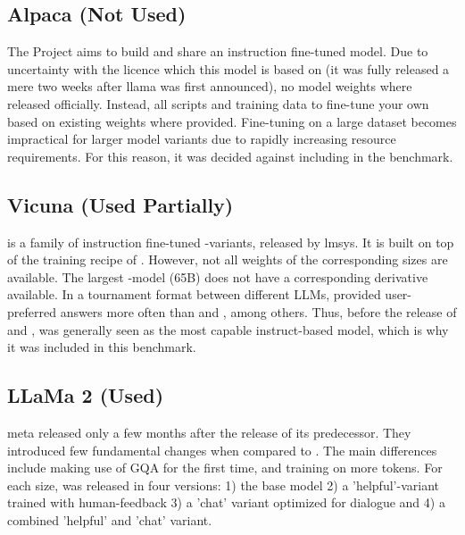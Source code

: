 \subsection{Alpaca (Not Used)}\label{sub:alpaca}
The  Project \cite{tatsulab_2023} aims to build and share an instruction fine-tuned  model.
Due to uncertainty with the  licence which this model is based on (it was fully released a mere two weeks after \gls{llama} was first announced), no model weights where released officially.
Instead, all scripts and training data to fine-tune your own  based on existing  weights where provided.
Fine-tuning on a large dataset becomes impractical for larger model variants due to rapidly increasing resource requirements.
For this reason, it was decided against including  in the benchmark.


\subsection{Vicuna (Used Partially)}\label{sub:vicuna}
 is a family of instruction fine-tuned -variants, released by \gls{lmsys}. It is built on top of the training recipe of .
However, not all weights of the corresponding  sizes are available.
The largest -model (65B) does not have a corresponding  derivative available.
In a tournament format between different \glspl{LLM},  provided user-preferred answers more often than  and  \cite{zheng_judging_2023}, among others.
Thus, before the release of  and ,  was generally seen as the most capable instruct-based model, which is why it was included in this benchmark.


\subsection{LLaMa 2 (Used)}\label{sub:llama2}
\gls{meta} released  \cite{touvron_llama2_2023} only a few months after the release of its predecessor.
They introduced few fundamental changes when compared to .
The main differences include making use of \gls{GQA} for the first time, and training on more tokens.
For each size,  was released in four versions: 1) the base model 2) a 'helpful'-variant trained with human-feedback 3) a 'chat' variant optimized for dialogue and 4) a combined 'helpful' and 'chat' variant.


